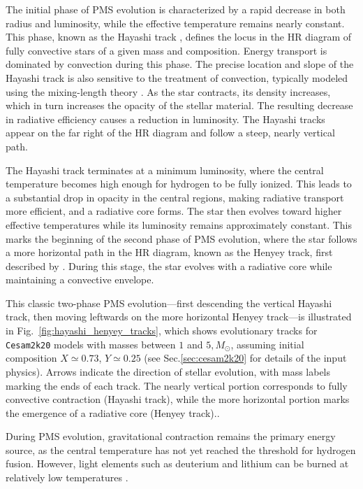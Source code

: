 \documentclass[12pt,a4paper]{article}
\begin{document}
The initial phase of PMS evolution is characterized by a rapid decrease in both radius and luminosity, while the effective temperature remains nearly constant. This phase, known as the Hayashi track \parencite{Hayashi1961}, defines the locus in the HR diagram of fully convective stars of a given mass and composition. Energy transport is dominated by convection during this phase. The precise location and slope of the Hayashi track is also sensitive to the treatment of convection, typically modeled using the mixing-length theory \parencite{CoxGiuli1968a}. As the star contracts, its density increases, which in turn increases the opacity of the stellar material. The resulting decrease in radiative efficiency causes a reduction in luminosity. The Hayashi tracks appear on the far right of the HR diagram and follow a steep, nearly vertical path.

The Hayashi track terminates at a minimum luminosity, where the central temperature becomes high enough for hydrogen to be fully ionized. This leads to a substantial drop in opacity in the central regions, making radiative transport more efficient, and a radiative core forms. The star then evolves toward higher effective temperatures while its luminosity remains approximately constant. This marks the beginning of the second phase of PMS evolution, where the star follows a more horizontal path in the HR diagram, known as the Henyey track, first described by \textcite{HenyeyEtAl1955}. During this stage, the star evolves with a radiative core while maintaining a convective envelope.

This classic two-phase PMS evolution—first descending the vertical Hayashi track, then moving leftwards on the more horizontal Henyey track—is illustrated in Fig.~\ref{fig:hayashi_henyey_tracks}, which shows evolutionary tracks for \texttt{Cesam2k20} models with masses between $1$ and $5,M_\odot$, assuming initial composition $X \simeq 0.73$, $Y \simeq 0.25$ (see Sec.\ref{sec:cesam2k20} for details of the input physics). Arrows indicate the direction of stellar evolution, with mass labels marking the ends of each track. The nearly vertical portion corresponds to fully convective contraction (Hayashi track), while the more horizontal portion marks the emergence of a radiative core (Henyey track)..

During PMS evolution, gravitational contraction remains the primary energy source, as the central temperature has not yet reached the threshold for hydrogen fusion. However, light elements such as deuterium and lithium can be burned at relatively low temperatures \parencite{KippenhahnEtAl2013}.
\end{document}

